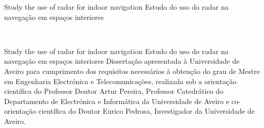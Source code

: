 %
%

\TitlePage
         {\ThesisYear}
        {Study the use of radar for indoor navigation \newline Estudo do uso
do radar na navegação em espaços interiores}
        
\EndTitlePage
\titlepage\ \endtitlepage %


%
%

\TitlePage
  \HEADER{}{\ThesisYear}
        {Study the use of radar for indoor navigation \newline Estudo do uso
do radar na navegação em espaços interiores}
  \vspace*{15mm}
  \TEXT{}
       {Dissertação apresentada à Universidade de Aveiro para cumprimento dos
requisitos necessários à obtenção do grau de Mestre em Engenharia Electrónica e Telecomunicações, realizada sob a orientação científica do Professor Doutor Artur Pereira, Professor Catedrático do Departamento de
Electrónica e Informática da Universidade de Aveiro e co-orientação científica do Doutor Eurico Pedrosa, Investigador da
Universidade de Aveiro.
        }
        \vspace*{85mm}
\EndTitlePage
\titlepage\ \endtitlepage %

